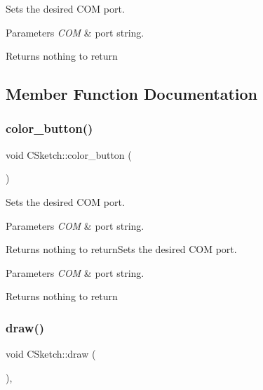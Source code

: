 Sets the desired C\+OM port. 


\begin{DoxyParams}{Parameters}
{\em C\+OM} & port string. \\
\hline
\end{DoxyParams}
\begin{DoxyReturn}{Returns}
nothing to return 
\end{DoxyReturn}


\subsection{Member Function Documentation}
\hypertarget{class_c_sketch_ac604ec5de27ef86c53a07ef999eb2f87}{}\label{class_c_sketch_ac604ec5de27ef86c53a07ef999eb2f87} 
\subsubsection{\texorpdfstring{color\+\_\+button()}{color\_button()}}
{\footnotesize\ttfamily void C\+Sketch\+::color\+\_\+button (\begin{DoxyParamCaption}{ }\end{DoxyParamCaption})}



Sets the desired C\+OM port. 


\begin{DoxyParams}{Parameters}
{\em C\+OM} & port string. \\
\hline
\end{DoxyParams}
\begin{DoxyReturn}{Returns}
nothing to return\+Sets the desired C\+OM port.
\end{DoxyReturn}

\begin{DoxyParams}{Parameters}
{\em C\+OM} & port string. \\
\hline
\end{DoxyParams}
\begin{DoxyReturn}{Returns}
nothing to return 
\end{DoxyReturn}
\hypertarget{class_c_sketch_a9db432ca87bbd8c8dfc0b38f274640f6}{}\label{class_c_sketch_a9db432ca87bbd8c8dfc0b38f274640f6} 
\subsubsection{\texorpdfstring{draw()}{draw()}}
{\footnotesize\ttfamily void C\+Sketch\+::draw (\begin{DoxyParamCaption}{ }\end{DoxyParamCaption})\hspace{0.3cm}{\ttfamily [override]}, {\ttfamily [virtual]}}



